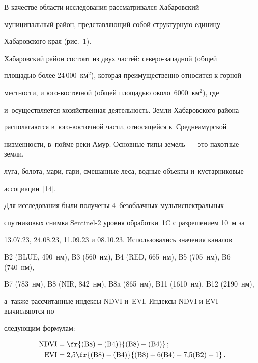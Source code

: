   В качестве области исследования рассматривался Хабаровский 

муниципальный район, представляющий собой структурную единицу 

Хабаровского края (рис.~1).







  Хабаровский район состоит из двух частей: северо-западной (общей 

пло\-щадью более 24\,000~км$^2$), которая преимущественно относится к горной 

мест\-ности, и юго-восточной (общей пло\-щадью около~6000~км$^2$), где 

и~осуществляется хозяйственная де\-я\-тель\-ность. Земли Хабаровского района 

располагаются в~юго-вос\-точ\-ной части, относящейся к~Среднеамурской 

низменности, в~пойме реки Амур. Основные типы земель~--- это пахотные земли, 

луга, болота, мари, гари, смешанные леса, водные объекты и~кустарниковые 

ассоциации~[14].





  

  Для исследования были получены 4~безоблачных мультиспектральных 

спутниковых снимка Sentinel-2 уровня обработки~1C с разрешением 10~м за 

13.07.23, 24.08.23, 11.09.23 и 08.10.23. Использовались значения каналов 

B2 (BLUE, 490~нм), B3 (560~нм), B4 (RED, 665~нм), B5 (705~нм), B6 (740~нм), 

B7 (783~нм), B8 (NIR, 842~нм), B8a (865~нм), B11 (1610~нм), B12 (2190~нм), 

а~также рассчитанные индексы NDVI и~EVI. Индексы NDVI и EVI вычисляются по 

следующим формулам:



\vspace*{-2pt}



\noindent

  \begin{align}

 \mathrm{NDVI} &= \fr{(\mathrm{B}8)-( \mathrm{B}4)}{( \mathrm{B}8)+( 

\mathrm{B}4)}\,;\label{e1-sp}\\

  \mathrm{EVI} &= 2{,}5\fr{(\mathrm{B}8)-( \mathrm{B}4)}{( 

\mathrm{B}8)+6(\mathrm{B}4)-7{,}5(\mathrm{B}2)+1}\,.

  \label{e2-sp}

  \end{align}

